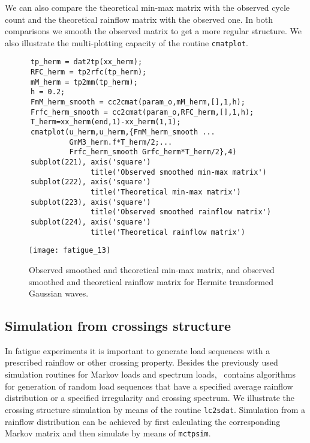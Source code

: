 We can also compare the theoretical min-max matrix with the observed
cycle count and the theoretical rainflow matrix with the observed
one. In both comparisons we smooth the observed matrix to get a more
regular structure. We also illustrate the multi-plotting capacity of
the routine {\tt cmatplot}.
{\small\begin{verbatim}
      tp_herm = dat2tp(xx_herm);
      RFC_herm = tp2rfc(tp_herm);
      mM_herm = tp2mm(tp_herm);
      h = 0.2;
      FmM_herm_smooth = cc2cmat(param_o,mM_herm,[],1,h);
      Frfc_herm_smooth = cc2cmat(param_o,RFC_herm,[],1,h);
      T_herm=xx_herm(end,1)-xx_herm(1,1);
      cmatplot(u_herm,u_herm,{FmM_herm_smooth ...
               GmM3_herm.f*T_herm/2;...
               Frfc_herm_smooth Grfc_herm*T_herm/2},4)
      subplot(221), axis('square')
                    title('Observed smoothed min-max matrix')
      subplot(222), axis('square')
                    title('Theoretical min-max matrix')
      subplot(223), axis('square')
                    title('Observed smoothed rainflow matrix')
      subplot(224), axis('square')
                    title('Theoretical rainflow matrix')
\end{verbatim}}
\begin{figure}
  \centering
  \texttt{[image: fatigue\_13]}
\vspace{-3mm}
\caption[Observed smoothed and theoretical min-max matrix]
{Observed smoothed and theoretical min-max matrix,
and observed smoothed and theoretical rainflow matrix for Hermite transformed
Gaussian waves.}
\label{fig_wafo_6.8}
\end{figure}

\subsection{Simulation from crossings structure}
\label{sec:crossingrainflowsimulation}

In fatigue experiments it is important to generate load sequences with a
prescribed rainflow or other crossing property. Besides the previously
used simulation routines for Markov loads and spectrum loads,
\progname ~contains algorithms for generation of random load sequences that
have a specified average rainflow distribution or a specified irregularity and
crossing spectrum. We illustrate the crossing structure simulation
by means of the routine {\tt lc2sdat}.
Simulation from a rainflow distribution can be achieved by first calculating the 
corresponding Markov matrix and then simulate by means of 
{\tt mctpsim}. 

